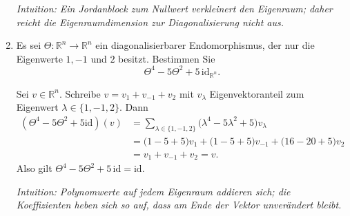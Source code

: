 \documentclass[11pt, a4paper]{article}
\begin{document}
\begin{enumerate}
\begin{framed}
  \medskip\noindent\textit{Intuition: Ein Jordanblock zum Nullwert verkleinert den Eigenraum; daher reicht die Eigenraumdimension zur Diagonalisierung nicht aus.}
  \end{framed}

  \item Es sei $\Theta:\mathbb{R}^n\to\mathbb{R}^n$ ein diagonalisierbarer Endomorphismus, der nur die Eigenwerte $1,-1$ und $2$ besitzt. Bestimmen Sie
  \[
    \Theta^4-5\Theta^2+5\,\mathrm{id}_{\mathbb{R}^n}.
  \]
  \begin{framed}
  Sei $v\in\mathbb{R}^n$. Schreibe $v=v_{1}+v_{-1}+v_{2}$ mit
  $v_\lambda$ Eigenvektoranteil zum Eigenwert $\lambda\in\{1,-1,2\}$. Dann
  \[
  \begin{aligned}
    (\Theta^4-5\Theta^2+5\mathrm{id})(v)
      &=\sum_{\lambda\in\{1,-1,2\}}\big(\lambda^4-5\lambda^2+5\big)v_\lambda\\
      &=\big(1-5+5\big)v_1+\big(1-5+5\big)v_{-1}
        +\big(16-20+5\big)v_2\\
      &=v_1+v_{-1}+v_2=v.
  \end{aligned}
  \]
  Also gilt $\Theta^4-5\Theta^2+5\,\mathrm{id}=\mathrm{id}$.

  \medskip\noindent\textit{Intuition: Polynomwerte auf jedem Eigenraum addieren sich; die Koeffizienten heben sich so auf, dass am Ende der Vektor unverändert bleibt.}
  \end{framed}
\end{enumerate}
\end{document}
